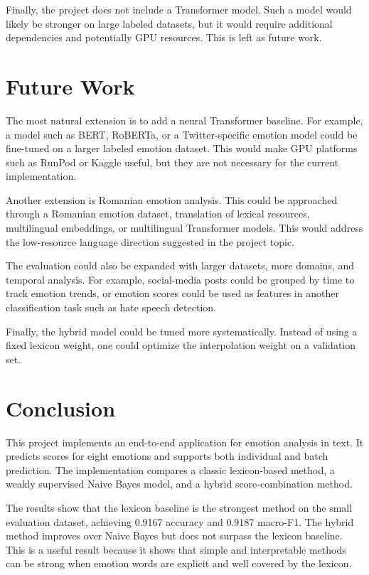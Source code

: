\documentclass[11pt]{article}
\begin{document}
Finally, the project does not include a Transformer model. Such a model would likely be stronger on large labeled datasets, but it would require additional dependencies and potentially GPU resources. This is left as future work.


\section{Future Work}

The most natural extension is to add a neural Transformer baseline. For example, a model such as BERT, RoBERTa, or a Twitter-specific emotion model could be fine-tuned on a larger labeled emotion dataset. This would make GPU platforms such as RunPod or Kaggle useful, but they are not necessary for the current implementation.

Another extension is Romanian emotion analysis. This could be approached through a Romanian emotion dataset, translation of lexical resources, multilingual embeddings, or multilingual Transformer models. This would address the low-resource language direction suggested in the project topic.

The evaluation could also be expanded with larger datasets, more domains, and temporal analysis. For example, social-media posts could be grouped by time to track emotion trends, or emotion scores could be used as features in another classification task such as hate speech detection.

Finally, the hybrid model could be tuned more systematically. Instead of using a fixed lexicon weight, one could optimize the interpolation weight on a validation set.

\section{Conclusion}

This project implements an end-to-end application for emotion analysis in text. It predicts scores for eight emotions and supports both individual and batch prediction. The implementation compares a classic lexicon-based method, a weakly supervised Naive Bayes model, and a hybrid score-combination method.

The results show that the lexicon baseline is the strongest method on the small evaluation dataset, achieving 0.9167 accuracy and 0.9187 macro-F1. The hybrid method improves over Naive Bayes but does not surpass the lexicon baseline. This is a useful result because it shows that simple and interpretable methods can be strong when emotion words are explicit and well covered by the lexicon.
\end{document}
